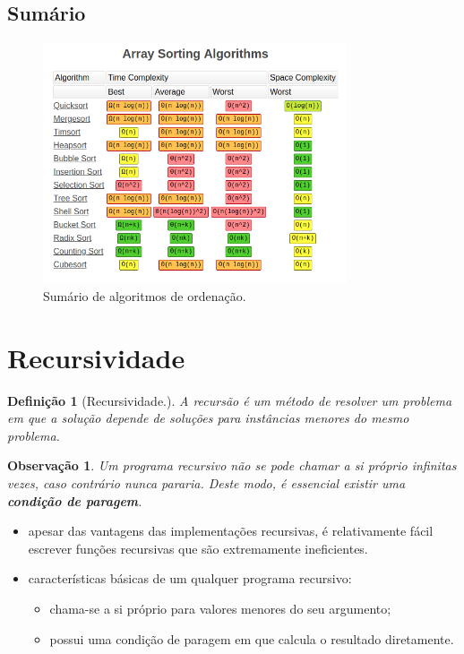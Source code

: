 \documentclass[a4paper, 12pt]{article}
\newtheorem{definition}{Definição}[section]
\newtheorem{remark}{Observação}
\begin{document}
\subsection{Sumário}

\begin{center}
    \begin{figure}[h!]
        \centering
        \includegraphics[width=0.8\textwidth]{fig/ao/sumario.png}
        \caption{Sumário de algoritmos de ordenação.}
    \end{figure}
\end{center}


\section{Recursividade}

\begin{definition}[Recursividade.]
    A recursão é um método de resolver um problema em que a solução depende de soluções para instâncias menores do mesmo problema.
\end{definition}

\begin{remark}
    Um programa recursivo não se pode chamar a si próprio infinitas vezes, caso contrário nunca pararia. Deste modo, é essencial existir uma \textbf{condição de paragem}.\end{remark}
\begin{itemize}
    \item apesar das vantagens das implementações recursivas, é relativamente fácil escrever funções recursivas que são extremamente ineficientes.
    \item características básicas de um qualquer programa recursivo:
    \begin{itemize}
        \item chama-se a si próprio para valores menores do seu argumento;
        \item possui uma condição de paragem em que calcula o resultado diretamente.
    \end{itemize}
\end{itemize}
\end{document}
